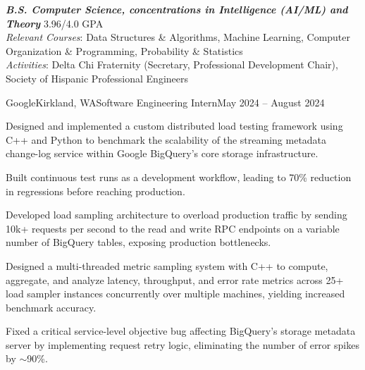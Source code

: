 \documentclass{article}
\begin{document}
\thispagestyle{empty}


\begin{flushleft}


{\textbf{\textit{B.S. Computer Science, concentrations in Intelligence (AI/ML) and Theory}} \hfill 3.96/4.0 GPA \\ \textit{Relevant Courses}:
    Data Structures \& Algorithms,
    Machine Learning,
    Computer Organization \& Programming,
    Probability \& Statistics
    \\
    \textit{Activities}: Delta Chi Fraternity (Secretary, Professional Development Chair), Society of Hispanic Professional Engineers
}



    \begin{experience}{Google}{Kirkland, WA}{Software Engineering Intern}{May 2024 -- August 2024}
        \item Designed and implemented a custom distributed load testing framework using C++ and Python to benchmark the scalability of the streaming metadata change-log service within Google BigQuery's core storage infrastructure.
        \item Built continuous test runs as a development workflow, leading to 70\% reduction in regressions before reaching production.
        \item Developed load sampling architecture to overload production traffic by sending 10k+ requests per second to the read and write RPC endpoints on a variable number of BigQuery tables, exposing production bottlenecks.
        \item Designed a multi-threaded metric sampling system with C++ to compute, aggregate, and analyze latency, throughput, and error rate metrics across 25+ load sampler instances concurrently over multiple machines, yielding increased benchmark accuracy.
        \item Fixed a critical service-level objective bug affecting BigQuery's storage metadata server by implementing request retry logic, eliminating the number of error spikes by $\sim$90\%.
    \end{experience}


\end{flushleft}
\end{document}
